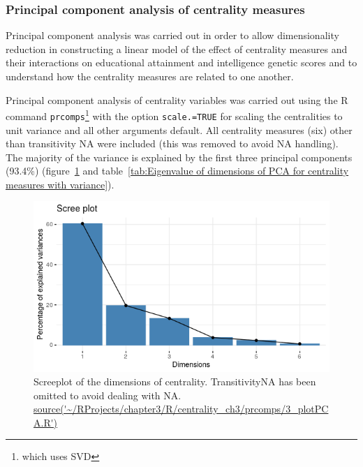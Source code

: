 \subsubsection{Principal component analysis of centrality measures}

Principal component analysis was carried out in order to allow dimensionality reduction in constructing a linear model of the effect of centrality measures and their interactions on educational attainment and intelligence genetic scores and to understand how the centrality measures are related to one another. 

Principal component analysis of centrality variables was carried out using the R command \texttt{prcomps}\footnote{which uses SVD} with the option \texttt{scale.=TRUE} for scaling the centralities to unit variance and all other arguments default. All centrality measures (six) other than transitivity NA were included (this was removed to avoid NA handling). The majority of the variance is explained by the first three principal components (93.4\%) (figure~\ref{fig:PCA_scree} and table~\ref{tab:Eigenvalue of dimensions of PCA for centrality measures with variance}).



\begin{figure}
    \centering
    \includegraphics[width=\textwidth]{images/chapter3/centrality_pca_factoextra/Rplot_screeplot.png}
    \caption{Screeplot of the dimensions of centrality. TransitivityNA has been omitted to avoid dealing with NA. \url{source('~/RProjects/chapter3/R/centrality_ch3/prcomps/3_plotPCA.R')}}
    \label{fig:PCA_scree}
\end{figure}

